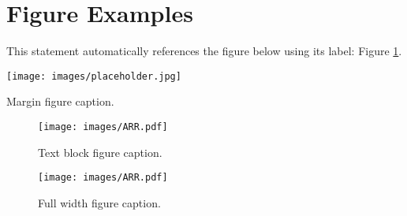 
\section{Figure Examples}

This statement automatically references the figure below using its label: Figure \ref{fig:example}.


\begin{marginfigure} %
    \texttt{[image: images/placeholder.jpg]}
    \caption{Margin figure caption.}
\end{marginfigure}


\begin{figure}[H] %
    \texttt{[image: images/ARR.pdf]}
    \caption{Text block figure caption.}
    \label{fig:example} %
\end{figure}


\begin{figure*} %
    \texttt{[image: images/ARR.pdf]}
    \caption{Full width figure caption.}
\end{figure*}
